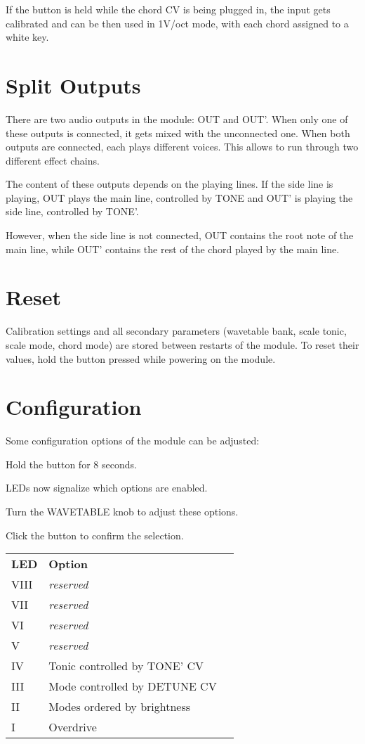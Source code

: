 \documentclass[10pt,nofoldmark,nocombine]{leaflet} %
\newenvironment{packed_enumerate}{
\begin{enumerate}
  \setlength{\itemsep}{1pt}
  \setlength{\parskip}{0pt}
  \setlength{\parsep}{0pt}
}{\end{enumerate}}
\begin{document}
If the button is held while the chord CV is being plugged in, the input gets calibrated and can be then used in 1V/oct mode, with each chord assigned to a white key.

\section{Split Outputs}

There are two audio outputs in the module: OUT and OUT'. When only one of these outputs is connected, it gets mixed with the unconnected one. When both outputs are connected, each plays different voices. This allows to run through two different effect chains.

The content of these outputs depends on the playing lines. If the side line is playing, OUT plays the main line, controlled by TONE and OUT' is playing the side line, controlled by TONE'.

However, when the side line is not connected, OUT contains the root note of the main line, while OUT' contains the rest of the chord played by the main line.

\section{Reset}

Calibration settings and all secondary parameters (wavetable bank, scale tonic, scale mode, chord mode) are stored between restarts of the module. To reset their values, hold the button pressed while powering on the module.

\section{Configuration}

Some configuration options of the module can be adjusted:

\begin{packed_enumerate}
  \item Hold the button for 8 seconds.
  \item LEDs now signalize which options are enabled.
  \item Turn the WAVETABLE knob to adjust these options.
  \item Click the button to confirm the selection.
\end{packed_enumerate}

\begin{tabular}{@{}lll@{}}
  \textbf{LED} & \textbf{Option} \\
  VIII & \textit{reserved} \\
  VII  & \textit{reserved} \\
  VI   & \textit{reserved} \\
  V    & \textit{reserved} \\
  IV   & Tonic controlled by TONE' CV \\
  III  & Mode controlled by DETUNE CV \\
  II   & Modes ordered by brightness \\
  I    & Overdrive
\end{tabular}
\end{document}

